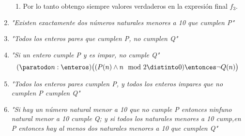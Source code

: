\begin{enumerate}[label=\tiny\faIcon{yin-yang}$_{\arabic*}$]
\begin{enumerate}[label=\tiny\faIcon{meh-rolling-eyes}]
          \item Por lo tanto obtengo siempre valores verdaderos en la expresión final $f_3$.
        \end{enumerate}

  \item \textit{"Existen exactamente dos números naturales menores a 10 que cumplen P"}

  \item \textit{"Todos los enteros pares que cumplen P, no cumplen Q"}

  \item \textit{"Si un entero cumple P y es impar, no cumple Q"}
        $$
          (\paratodo n: \enteros)\bigr( (P(n) \land n \mod 2 \distinto 0 ) \entonces \neg Q(n) \bigr)
        $$

  \item \textit{"Todos los enteros pares cumplen P, y todos los enteros impares que no cumplen P cumplen Q"}

  \item \textit{"Si hay un número natural menor a 10 que no cumple P entonces ninfuno natural menor a 10 cumple Q; y si todos los
          naturales menores a 10 cump,en P entonces hay al menos dos naturales menores a 10 que cumplen Q"}
\end{enumerate}


